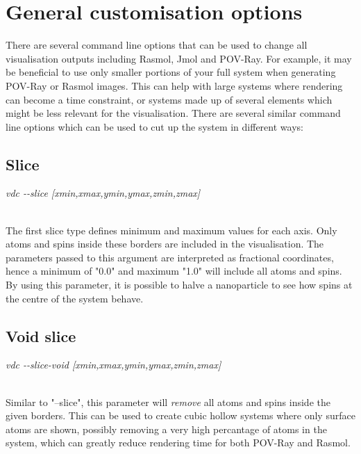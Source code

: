 \section*{General customisation options}

There are several command line options that can be used to change all visualisation outputs including Rasmol, Jmol and POV-Ray. For example, it may be beneficial to use only smaller portions of your full system when generating POV-Ray or Rasmol images. This can help with large systems where rendering can become a time constraint, or systems made up of several elements which might be less relevant for the visualisation. There are several similar command line options which can be used to cut up the system in different ways:

\subsection*{Slice}

\begin{minipage}[c]{\textwidth}
\centering
\textit{vdc -{}-slice [xmin,xmax,ymin,ymax,zmin,zmax]}
\end{minipage}\\

The first slice type defines minimum and maximum values for each axis. Only atoms and spins inside these borders are included in the visualisation. The parameters passed to this argument are interpreted as fractional coordinates, hence a minimum of "0.0" and maximum "1.0" will include all atoms and spins. \\

By using this parameter, it is possible to halve a nanoparticle to see how spins at the centre of the system behave.\\

\subsection*{Void slice}

\begin{minipage}[c]{\textwidth}
\centering
\textit{vdc -{}-slice-void [xmin,xmax,ymin,ymax,zmin,zmax]}
\end{minipage}\\

Similar to "--slice", this parameter will \textit{remove} all atoms and spins inside the given borders. This can be used to create cubic hollow systems where only surface atoms are shown, possibly removing a very high percantage of atoms in the system, which can greatly reduce rendering time for both POV-Ray and Rasmol. \\


